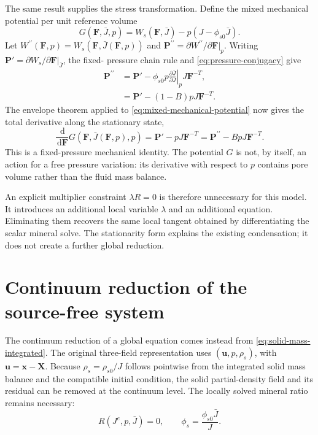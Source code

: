 \documentclass[11pt]{article}
\newcommand{\mbf}[1]{\mathbf{#1}}
\newcommand{\dd}{\,\mathrm d}
\newcommand{\pder}[2]{\frac{\partial #1}{\partial #2}}
\begin{document}
The same result supplies the stress transformation.  Define the mixed
mechanical potential per unit reference volume
\begin{equation}
 G(\mbf F,\bar J,p)
 =W_s(\mbf F,\bar J)-p\left(J-\phi_{s0}\bar J\right).
 \label{eq:mixed-mechanical-potential}
\end{equation}
Let \(W^{\prime\prime}(\mbf F,p)=W_s(\mbf F,\bar J(\mbf F,p))\) and
\(\mbf P^{\prime\prime}=\partial W^{\prime\prime}/\partial\mbf F|_p\).
Writing \(\mbf P'=\partial W_s/\partial\mbf F|_{\bar J}\), the fixed-
pressure chain rule and \cref{eq:pressure-conjugacy} give
\begin{align}
 \mbf P^{\prime\prime}
 &=\mbf P'-\phi_{s0}p
 \left.\pder{\bar J}{J}\right|_pJ\mbf F^{-T},
 \label{eq:fixed-pressure-stress-chain-rule}\\
 &=\mbf P'-(1-B)pJ\mbf F^{-T}.
 \label{eq:prime-stress-transform}
\end{align}
The envelope theorem applied to \cref{eq:mixed-mechanical-potential} now
gives the total derivative along the stationary state,
\begin{equation}
 \frac{\dd}{\dd\mbf F}G(\mbf F,\bar J(\mbf F,p),p)
 =\mbf P'-pJ\mbf F^{-T}
 =\mbf P^{\prime\prime}-BpJ\mbf F^{-T}.
 \label{eq:mixed-stress-total}
\end{equation}
This is a fixed-pressure mechanical identity.  The potential \(G\) is not,
by itself, an action for a free pressure variation: its derivative with
respect to \(p\) contains pore volume rather than the fluid mass balance.

An explicit multiplier constraint \(\lambda R=0\) is therefore unnecessary
for this model.  It introduces an additional local variable \(\lambda\) and
an additional equation.  Eliminating them recovers the same local tangent
obtained by differentiating the scalar mineral solve.  The stationarity form
explains the existing condensation; it does not create a further global
reduction.

\section{Continuum reduction of the source-free system}
\label{sec:reduction}

The continuum reduction of a global equation comes instead from
\cref{eq:solid-mass-integrated}.  The original three-field representation
uses \((\mbf u,p,\rho_s)\), with \(\mbf u=\mbf x-\mbf X\).  Because
\(\rho_s=\rho_{s0}/J\) follows pointwise from the integrated solid mass
balance and the compatible initial condition, the solid partial-density field
and its residual can be removed at the continuum level.
The locally solved mineral ratio remains necessary:
\begin{equation}
 R(J^e,p,\bar J)=0,
 \qquad
 \phi_s=\frac{\phi_{s0}\bar J}{J}.
 \label{eq:reduced-local-state}
\end{equation}
\end{document}
